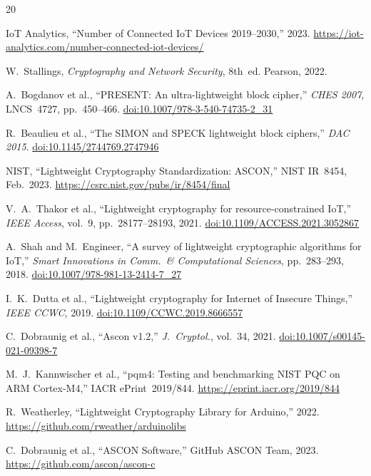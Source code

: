 \documentclass[anonymous]{ndss}
\begin{document}
\balance
\begin{thebibliography}{20}

IoT Analytics, ``Number of Connected IoT Devices 2019--2030,'' 2023.
\url{https://iot-analytics.com/number-connected-iot-devices/}

W.~Stallings, \textit{Cryptography and Network Security}, 8th~ed. Pearson, 2022.

A.~Bogdanov et al., ``PRESENT: An ultra-lightweight block cipher,''
\textit{CHES 2007}, LNCS~4727, pp.~450--466.
\href{https://doi.org/10.1007/978-3-540-74735-2_31}{doi:10.1007/978-3-540-74735-2\_31}

R.~Beaulieu et al., ``The SIMON and SPECK lightweight block ciphers,''
\textit{DAC 2015}.
\href{https://doi.org/10.1145/2744769.2747946}{doi:10.1145/2744769.2747946}

NIST, ``Lightweight Cryptography Standardization: ASCON,'' NIST IR~8454,
Feb.~2023. \url{https://csrc.nist.gov/pubs/ir/8454/final}

V.~A.~Thakor et al., ``Lightweight cryptography for resource-constrained IoT,''
\textit{IEEE Access}, vol.~9, pp.~28177--28193, 2021.
\href{https://doi.org/10.1109/ACCESS.2021.3052867}{doi:10.1109/ACCESS.2021.3052867}

A.~Shah and M.~Engineer, ``A survey of lightweight cryptographic algorithms
for IoT,'' \textit{Smart Innovations in Comm.\ \& Computational Sciences},
pp.~283--293, 2018.
\href{https://doi.org/10.1007/978-981-13-2414-7_27}{doi:10.1007/978-981-13-2414-7\_27}

I.~K.~Dutta et al., ``Lightweight cryptography for Internet of Insecure Things,''
\textit{IEEE CCWC}, 2019.
\href{https://doi.org/10.1109/CCWC.2019.8666557}{doi:10.1109/CCWC.2019.8666557}

C.~Dobraunig et al., ``Ascon v1.2,'' \textit{J.\ Cryptol.}, vol.~34, 2021.
\href{https://doi.org/10.1007/s00145-021-09398-7}{doi:10.1007/s00145-021-09398-7}

M.~J.~Kannwischer et al., ``pqm4: Testing and benchmarking NIST PQC on
ARM Cortex-M4,'' IACR ePrint~2019/844.
\url{https://eprint.iacr.org/2019/844}

R.~Weatherley, ``Lightweight Cryptography Library for Arduino,'' 2022.
\url{https://github.com/rweather/arduinolibs}

C.~Dobraunig et al., ``ASCON Software,'' GitHub ASCON Team, 2023.
\url{https://github.com/ascon/ascon-c}


\end{thebibliography}
\end{document}
